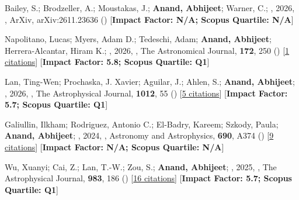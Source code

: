 \item[{\color{numcolor}\scriptsize8}] Bailey, S.; Brodzeller, A.; Moustakas, J.; \textbf{Anand, Abhijeet}; Warner, C.; \etal, 2026, , ArXiv, arXiv:2611.23636 () [\textbf{Impact Factor: N/A; Scopus Quartile: N/A}]

\item[{\color{numcolor}\scriptsize7}] Napolitano, Lucas; Myers, Adam D.; Tedeschi, Adam; \textbf{Anand, Abhijeet}; Herrera-Alcantar, Hiram K.; \etal, 2026, , The Astronomical Journal, \textbf{172}, 250 () [\href{https://ui.adsabs.harvard.edu/abs/2026AJ....172..250N}{1 citations}] [\textbf{Impact Factor: 5.8; Scopus Quartile: Q1}]

\item[{\color{numcolor}\scriptsize6}] Lan, Ting-Wen; Prochaska, J. Xavier; Aguilar, J.; Ahlen, S.; \textbf{Anand, Abhijeet}; \etal, 2026, , The Astrophysical Journal, \textbf{1012}, 55 () [\href{https://ui.adsabs.harvard.edu/abs/2026ApJ..1012...55L}{5 citations}] [\textbf{Impact Factor: 5.7; Scopus Quartile: Q1}]

\item[{\color{numcolor}\scriptsize5}] Galiullin, Ilkham; Rodriguez, Antonio C.; El-Badry, Kareem; Szkody, Paula; \textbf{Anand, Abhijeet}; \etal, 2024, , Astronomy and Astrophysics, \textbf{690}, A374 () [\href{https://ui.adsabs.harvard.edu/abs/2024A&A...690A.374G}{9 citations}] [\textbf{Impact Factor: N/A; Scopus Quartile: N/A}]

\item[{\color{numcolor}\scriptsize4}] Wu, Xuanyi; Cai, Z.; Lan, T.-W.; Zou, S.; \textbf{Anand, Abhijeet}; \etal, 2025, , The Astrophysical Journal, \textbf{983}, 186 () [\href{https://ui.adsabs.harvard.edu/abs/2025ApJ...983..186W}{16 citations}] [\textbf{Impact Factor: 5.7; Scopus Quartile: Q1}]

